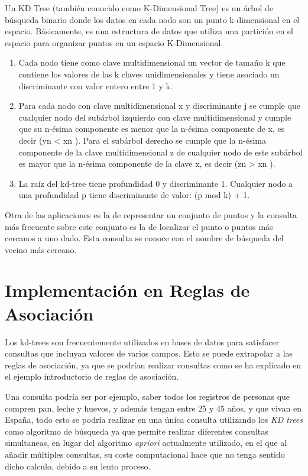 \documentclass{cosas/tfg_domingo}
\begin{document}
Un KD Tree (también conocido como K-Dimensional Tree) es un árbol de búsqueda binario donde los datos en cada nodo son un punto k-dimensional en el espacio. Básicamente, es una estructura de datos que utiliza una partición en el espacio para organizar puntos en un espacio K-Dimensional.

\begin{enumerate}
    \item Cada nodo tiene como clave multidimensional un vector de tamaño k
que contiene los valores de las k claves unidimensionales y tiene asociado un discriminante con valor entero entre 1 y k.
    \item Para cada nodo con clave multidimensional x y discriminante j se
cumple que cualquier nodo del subárbol izquierdo con clave multidimensional y cumple que su n-ésima componente es menor que la n-ésima componente de x, es decir (yn < xn ). Para el subárbol derecho se cumple que la n-ésima componente de la clave multidimensional z de cualquier nodo de este subárbol es mayor que la n-ésima componente de la clave x, es decir (zn > xn ).
    \item La raíz del kd-tree tiene profundidad 0 y discriminante 1. Cualquier
nodo a una profundidad p tiene discriminante de valor: (p mod k) + 1.
\citep{marti2010copy}
\end{enumerate}

Otra de las aplicaciones es la de representar un conjunto de puntos y la consulta más frecuente sobre este conjunto es la de localizar el punto o puntos más cercanos a uno dado. Esta consulta se conoce con el nombre de búsqueda del vecino más cercano.

\section{Implementación en Reglas de Asociación}

Los kd-trees son frecuentemente utilizados en bases de datos para satisfacer consultas que incluyan valores de varios campos. Esto se puede extrapolar a las reglas de asociación, ya que se podrían realizar consultas como se ha explicado en el ejemplo introductorio de reglas de asociación.

\hspace{0.5mm}

Una consulta podría ser por ejemplo, saber todos los registros de personas que compren pan, leche y huevos, y además tengan entre 25 y 45 años, y que vivan en España, todo esto se podría realizar en una única consulta utilizando los \textit{KD trees} como algoritmo de búsqueda ya que permite realizar diferentes consultas simultaneas, en lugar del algoritmo \textit{apriori} actualmente utilizado, en el que al añadir múltiples consultas, su coste computacional hace que no tenga sentido dicho calculo, debido a su lento proceso.
\end{document}
